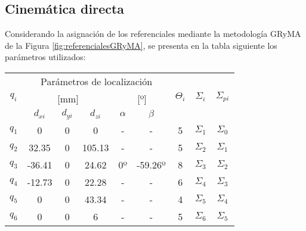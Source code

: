 \subsection{Cinemática directa}
    \noindent Considerando la asignación de los referenciales mediante la metodología GRyMA de la Figura \ref{fig:referencialesGRyMA},
    se presenta en la tabla siguiente los parámetros utilizados:

    \begin{table}[H]
        \centering
        \begin{center}
            \begin{tabular}{c||ccc|cc|c|c|c}
                \multirow{3}{*}{$q_i$} & \multicolumn{5}{c|}{Parámetros de localización}               & \multirow{3}{*}{$\Theta_i$} & \multirow{3}{*}{$\Sigma_i$} & \multirow{3}{*}{$\Sigma_{pi}$} \\
                                       & \multicolumn{3}{c|}{{[}mm{]}}  & \multicolumn{2}{c|}{{[}º{]}} &                             &                             &                                \\
                                       & $d_{xi}$ & $d_{yi}$ & $d_{zi}$ & $\alpha$      & $\beta$      &                             &                             &                                \\ \hline \hline
                $q_1$                  & 0        & 0        & 0        & -             & -            & 5                           & $\Sigma_1$                  & $\Sigma_0$                     \\
                $q_2$                  & 32.35    & 0        & 105.13   & -             & -            & 5                           & $\Sigma_2$                  & $\Sigma_1$                     \\
                $q_3$                  & -36.41   & 0        & 24.62    & 0º            & -59.26º      & 8                           & $\Sigma_3$                  & $\Sigma_2$                     \\
                $q_4$                  & -12.73   & 0        & 22.28    & -             & -            & 6                           & $\Sigma_4$                  & $\Sigma_3$                     \\
                $q_5$                  & 0        & 0        & 43.34    & -             & -            & 4                           & $\Sigma_5$                  & $\Sigma_4$                     \\
                $q_6$                  & 0        & 0        & 6        & -             & -            & 5                           & $\Sigma_6$                  & $\Sigma_5$                    
            \end{tabular}
        \end{center}
    \end{table}

